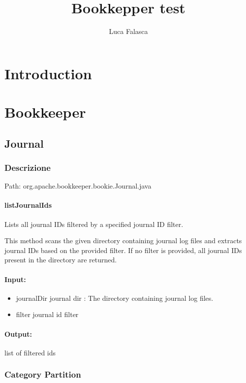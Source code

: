 \documentclass[12pt, a4paper]{article}
\title{Bookkepper test}
\author{Luca Falasca}
\begin{document}
\maketitle

\thispagestyle{empty}
\tableofcontents

\listoffigures
\listoftables


\thispagestyle{empty}
\newpage
\setcounter{page}{1}
\section{Introduction}

\section{Bookkeeper}
\subsection{Journal}
\subsubsection{Descrizione}
Path: org.apache.bookkeeper.bookie.Journal.java \\

\paragraph{listJournalIds}
Lists all journal IDs filtered by a specified journal ID filter.

This method scans the given directory containing journal log files and extracts
journal IDs based on the provided filter. If no filter is provided, all journal
IDs present in the directory are returned.


\paragraph{Input:}
\begin{itemize}
  \item journalDir journal dir : The directory containing journal log files.
  \item filter journal id filter
\end{itemize}
\paragraph{Output:}
    list of filtered ids

\subsubsection{Category Partition}
\end{document}
